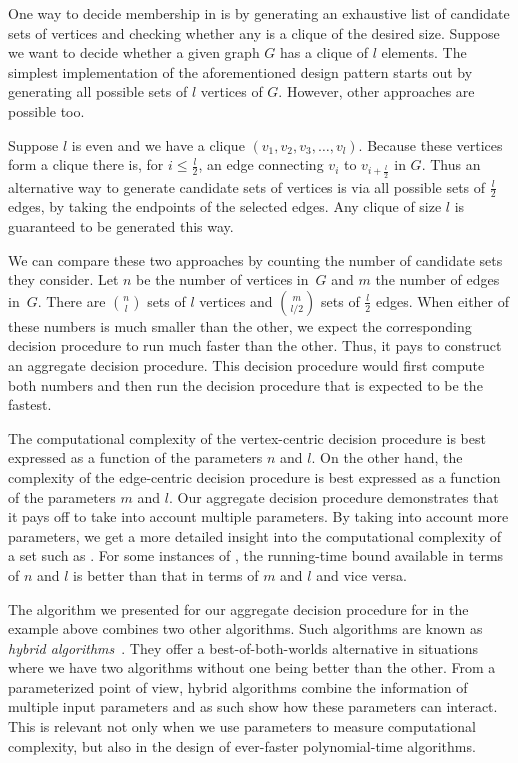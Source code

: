 \begin{example}
  One way to decide membership in  is by generating an exhaustive list of candidate sets of vertices and checking whether any is a clique of the desired size.
  Suppose we want to decide whether a given graph $G$ has a clique of $l$ elements.
  The simplest implementation of the aforementioned design pattern starts out by generating all possible sets of $l$ vertices of $G$.
  However, other approaches are possible too.

  Suppose $l$ is even and we have a clique $(v_1, v_2, v_3, \ldots, v_l)$.
  Because these vertices form a clique there is, for $i \le \frac{l}{2}$, an edge connecting $v_i$ to $v_{i + \frac{l}{2}}$ in $G$.
  Thus an alternative way to generate candidate sets of vertices is via all possible sets of $\frac{l}{2}$ edges, by taking the endpoints of the selected edges.
  Any clique of size $l$ is guaranteed to be generated this way.

  We can compare these two approaches by counting the number of candidate sets they consider.
  Let $n$ be the number of vertices in~$G$ and $m$ the number of edges in~$G$.
  There are $\binom{n}{l}$ sets of $l$ vertices and $\binom{m}{l / 2}$ sets of $\frac{l}{2}$ edges.
  When either of these numbers is much smaller than the other, we expect the corresponding decision procedure to run much faster than the other.
  Thus, it pays to construct an aggregate decision procedure.
  This decision procedure would first compute both numbers and then run the decision procedure that is expected to be the fastest.

  The computational complexity of the vertex-centric decision procedure is best expressed as a function of the parameters $n$ and $l$.
  On the other hand, the complexity of the edge-centric decision procedure is best expressed as a function of the parameters $m$ and $l$.
  Our aggregate decision procedure demonstrates that it pays off to take into account multiple parameters.
  By taking into account more parameters, we get a more detailed insight into the computational complexity of a set such as .
  For some instances of , the running-time bound available in terms of $n$ and $l$ is better than that in terms of $m$ and $l$ and vice versa.
\end{example}

The algorithm we presented for our aggregate decision procedure for  in the example above combines two other algorithms.
Such algorithms are known as \emph{hybrid algorithms}~\parencite{malek1994hybrid}.
They offer a best-of-both-worlds alternative in situations where we have two algorithms without one being better than the other.
From a parameterized point of view, hybrid algorithms combine the information of multiple input parameters and as such show how these parameters can interact.
This is relevant not only when we use parameters to measure computational complexity, but also in the design of ever-faster polynomial-time algorithms.

